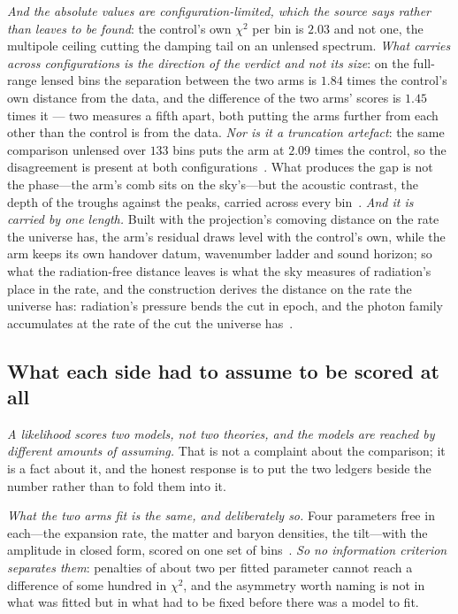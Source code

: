 \documentclass[11pt,a4paper]{article}
\theoremstyle{plain}
\theoremstyle{definition}
\begin{document}
\emph{And the absolute values are configuration-limited, which the source says rather than leaves to be
found}: the control's own $\chi^{2}$ per bin is $2.03$ and not one, the multipole ceiling cutting the damping
tail on an unlensed spectrum. \emph{What carries across configurations is the direction of the verdict and not its size}: on
the full-range lensed bins the separation between the two arms is $1.84$ times the control's own distance
from the data, and the difference of the two arms' scores is $1.45$ times it --- two measures a fifth
apart, both putting the arms further from each other than the control is from the data. \emph{Nor is it a truncation artefact}: the same comparison unlensed over $133$ bins puts the arm at $2.09$ times the control, so the disagreement is present at both configurations~\cite{JanzenCRcosmology}. What produces the gap is not the phase---the arm's comb sits on the sky's---but the acoustic contrast, the depth of the troughs against the peaks, carried across every bin~\cite{JanzenCRcosmology}. \emph{And it is carried by one length.} Built with the projection's comoving distance on the rate the universe has, the arm's residual draws level with the control's own, while the arm keeps its own handover datum, wavenumber ladder and sound horizon; so what the radiation-free distance leaves is what the sky measures of radiation's place in the rate, and the construction derives the distance on the rate the universe has: radiation's pressure bends the cut in epoch, and the photon family accumulates at the rate of the cut the universe has~\cite{JanzenCRcosmology}.

\subsection{What each side had to assume to be scored at all}\label{sec:assumptions}

\emph{A likelihood scores two models, not two theories, and the models are reached by different amounts of
assuming.} That is not a complaint about the comparison; it is a fact about it, and the honest response is to
put the two ledgers beside the number rather than to fold them into it.

\emph{What the two arms fit is the same, and deliberately so.} Four parameters free in each---the expansion
rate, the matter and baryon densities, the tilt---with the amplitude in closed form, scored on one set of
bins~\cite{JanzenCRcosmology}. \emph{So no information criterion separates them}: penalties of about two per
fitted parameter cannot reach a difference of some hundred in $\chi^{2}$, and the asymmetry worth naming is not
in what was fitted but in what had to be fixed before there was a model to fit.
\end{document}
